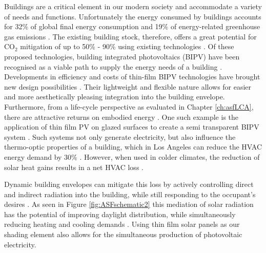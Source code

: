 

Buildings are a critical element in our modern society and accommodate a variety of needs and functions. Unfortunately the energy consumed by buildings accounts for 32\% of global final energy consumption and 19\% of energy-related greenhouse gas emissions \cite{IPCC}. The existing building stock, therefore, offers a great potential for CO$_2$ mitigation of up to 50\% - 90\% using existing technologies \cite{IPCC}. Of these proposed technologies, building integrated photovoltaics (BIPV) have been recognised as a viable path to supply the energy needs of a building \cite{defaix2012technical,raugei2009life}. \\



Developments in efficiency and costs of thin-film BIPV technologies have brought new design possibilities \cite{NREL, kushiya2014cis, kaelin2004low,jelle2012building}. Their lightweight and flexible nature allows for easier and more aesthetically pleasing integration into the building envelope. Furthermore, from a life-cycle perspective as evaluated in Chapter \ref{ch:asfLCA}, there are attractive returns on embodied energy \cite{perez2012faccade,jayathissa2016life}. One such example is the application of thin film PV on glazed surfaces to create a semi transparent BIPV system \cite{li2009energy,peng2016numerical,vats2012energy}. Such systems not only generate electricity, but also influence the thermo-optic properties of a building, which in Los Angeles can reduce the HVAC energy demand by 30\% \cite{chae2014building}. However, when used in colder climates, the reduction of solar heat gains results in a net HVAC loss \cite{chae2014building}.

Dynamic building envelopes can mitigate this loss by actively controlling direct and indirect radiation into the building, while still responding to the occupant's desires \cite{loonen2013climate}. As seen in Figure \ref{fig:ASFschematic2} this mediation of solar radiation has the potential of improving daylight distribution, while simultaneously reducing heating and cooling demands \cite{nagy2016adaptive}. Using thin film solar panels as our shading element also allows for the simultaneous production of photovoltaic electricity. \\



